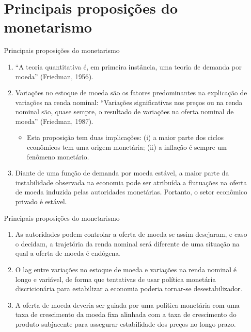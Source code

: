 \documentclass[10pt]{beamer}
\begin{document}
\section{Principais proposições do monetarismo}
\begin{frame}{Principais proposições do monetarismo}
    \begin{enumerate}
        \item ``A teoria quantitativa é, em primeira instância, uma teoria de demanda por moeda'' (Friedman, 1956).
        \bigskip
        \item Variações no estoque de moeda são os fatores predominantes na explicação de variações na renda nominal: ``Variações significativas nos preços ou na renda nominal são, quase sempre, o resultado de variações na oferta nominal de moeda'' (Friedman, 1987).
        \bigskip
        \begin{itemize}
            \item Esta proposição tem duas implicações: (i) a maior parte dos ciclos econômicos tem uma origem monetária; (ii) a inflação é sempre um fenômeno monetário.
        \end{itemize}
        \bigskip
        \item Diante de uma função de demanda por moeda estável, a maior parte da instabilidade observada na economia pode ser atribuída a flutuações na oferta de moeda induzida pelas autoridades monetárias. Portanto, o setor econômico privado é estável.
    \end{enumerate}
\end{frame}

\begin{frame}{Principais proposições do monetarismo}
    \begin{enumerate}        
        \item As autoridades podem controlar a oferta de moeda se assim desejaram, e caso o decidam, a trajetória da renda nominal será diferente de uma situação na qual a oferta de moeda é endógena.
        \bigskip
        \item O lag entre variações no estoque de moeda e variações na renda nominal é longo e variável, de forma que tentativas de usar política monetária discricionária para estabilizar a economia poderia tornar-se desestabilizador.
        \bigskip
        \item A oferta de moeda deveria ser guiada por uma política monetária com uma taxa de crescimento da moeda fixa alinhada com a taxa de crescimento do produto subjacente para assegurar estabilidade dos preços no longo prazo.
    \end{enumerate}
\end{frame}
\end{document}
